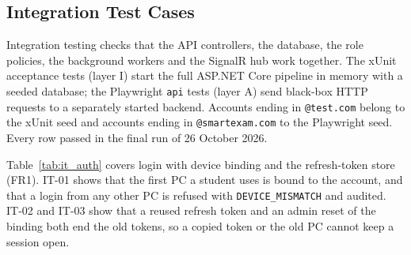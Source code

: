 \subsection{Integration Test Cases}
\label{sec:it_cases}

Integration testing checks that the API controllers, the database, the role policies, the background workers and the SignalR hub work together. The xUnit acceptance tests (layer I) start the full ASP.NET Core pipeline in memory with a seeded database; the Playwright \texttt{api} tests (layer A) send black-box HTTP requests to a separately started backend. Accounts ending in \texttt{@test.com} belong to the xUnit seed and accounts ending in \texttt{@smartexam.com} to the Playwright seed.
Every row passed in the final run of 26 October 2026.

Table~\ref{tab:it_auth} covers login with device binding and the refresh-token store (FR1). IT-01 shows that the first PC a student uses is bound to the account, and that a login from any other PC is refused with \texttt{DEVICE\_\allowbreak{}MISMATCH} and audited. IT-02 and IT-03 show that a reused refresh token and an admin reset of the binding both end the old tokens, so a copied token or the old PC cannot keep a session open.

